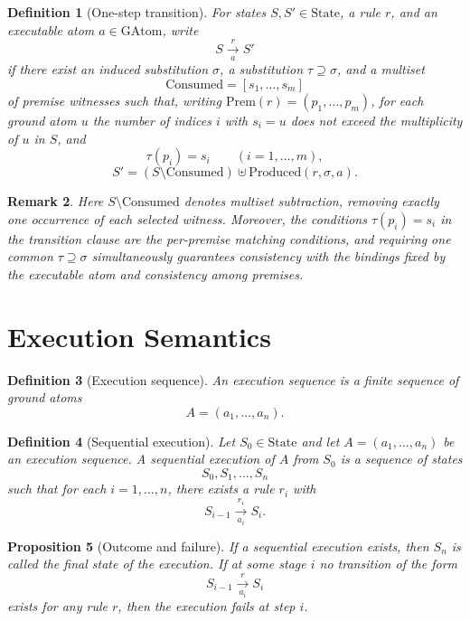 \documentclass[11pt]{article}
\newtheorem{definition}{Definition}[section]
\newtheorem{proposition}[definition]{Proposition}
\newtheorem{remark}[definition]{Remark}
\newcommand{\GAtom}{\mathrm{GAtom}}
\newcommand{\State}{\mathrm{State}}
\newcommand{\Prem}{\mathrm{Prem}}
\newcommand{\MS}{\mathbin{\uplus}}
\newcommand{\Produced}{\mathrm{Produced}}
\newcommand{\Consumed}{\mathrm{Consumed}}
\begin{document}
\begin{definition}[One-step transition]
For states $S,S' \in \State$, a rule $r$, and an executable atom $a \in \GAtom$, write
\[
S \xrightarrow[a]{r} S'
\]
if there exist an induced substitution $\sigma$, a substitution $\tau \supseteq \sigma$, and a multiset
\[
\Consumed = [s_1,\dots,s_m]
\]
of premise witnesses such that, writing $\Prem(r)=(p_1,\dots,p_m)$, for each ground atom $u$ the number of indices $i$ with $s_i=u$ does not exceed the multiplicity of $u$ in $S$, and
\[
\tau(p_i)=s_i \qquad (i=1,\dots,m),
\]
\[
S' = (S \setminus \Consumed)\MS \Produced(r,\sigma,a).
\]
\end{definition}

\begin{remark}
Here $S \setminus \Consumed$ denotes multiset subtraction, removing exactly one occurrence of each selected witness.
Moreover, the conditions $\tau(p_i)=s_i$ in the transition clause are the per-premise matching conditions, and requiring one common $\tau \supseteq \sigma$ simultaneously guarantees consistency with the bindings fixed by the executable atom and consistency among premises.
\end{remark}

\section{Execution Semantics}

\begin{definition}[Execution sequence]
An execution sequence is a finite sequence of ground atoms
\[
A=(a_1,\dots,a_n).
\]
\end{definition}

\begin{definition}[Sequential execution]
Let $S_0 \in \State$ and let $A=(a_1,\dots,a_n)$ be an execution sequence.
A sequential execution of $A$ from $S_0$ is a sequence of states
\[
S_0,S_1,\dots,S_n
\]
such that for each $i=1,\dots,n$, there exists a rule $r_i$ with
\[
S_{i-1} \xrightarrow[a_i]{r_i} S_i.
\]
\end{definition}

\begin{proposition}[Outcome and failure]
If a sequential execution exists, then $S_n$ is called the final state of the execution.
If at some stage $i$ no transition of the form
\[
S_{i-1} \xrightarrow[a_i]{r} S_i
\]
exists for any rule $r$, then the execution fails at step $i$.
\end{proposition}
\end{document}
